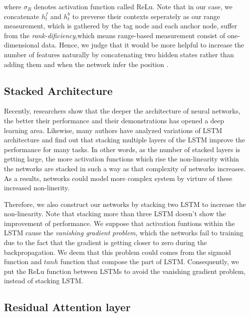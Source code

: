 \documentclass{ieeeaccess}
\begin{document}
where $\sigma _{R}$ denotes activation function called ReLu. Note that in our case, we concatenate $h^{f}_{t}$ and $h^{b}_{t}$ to preverse their contexts seperately as our range measurement, which is gathered by the tag node and each anchor node, suffer from the \textit{rank-dificiency},which means range-based measurement consist of one-dimensional data\cite{fabresse2013undelayed}. Hence, we judge that it would be more helpful to increase the number of features naturally by concatenating two hidden states rather than adding them and when the network infer the position  .

\subsection{Stacked Architecture}

Recently, researchers show that the deeper the architecture of neural networks, the better their performance\cite{simonyan2014very, he2016deep} and their demonstrations has opened a deep learning area. Likewise, many authors have analyzed variations of LSTM architecture and find out that stacking multiple layers of the LSTM improve the performance for many tasks\cite{graves2013hybrid, graves2013speech,ullah2018action}. In other words, as the number of stacked layers is getting large, the more activation functions which rise the non-linearity within the networks are stacked  in such a way as that complexity of networks increases. As a results, networks could model more complex system by virture of these increased non-linerity.

Therefore, we also construct our networks by stacking two LSTM to increase the non-linearity. Note that stacking more than three LSTM doesn't show the improvement of performance. We suppose that activation funtions within the LSTM cause the \textit{vanishing gradient problem}\cite{pascanu2013difficulty}, which the networks fail to training due to the fact that the gradient is getting closer to zero during the backpropagation. We deem that this problem could comes from the sigmoid function and $tanh$ function that compose the part of LSTM. Consequently, we put the ReLu function between LSTMs to avoid the vanishing gradient problem\cite{nair2010rectified}, instead of stacking LSTM.    

\subsection{Residual Attention layer}
\end{document}
